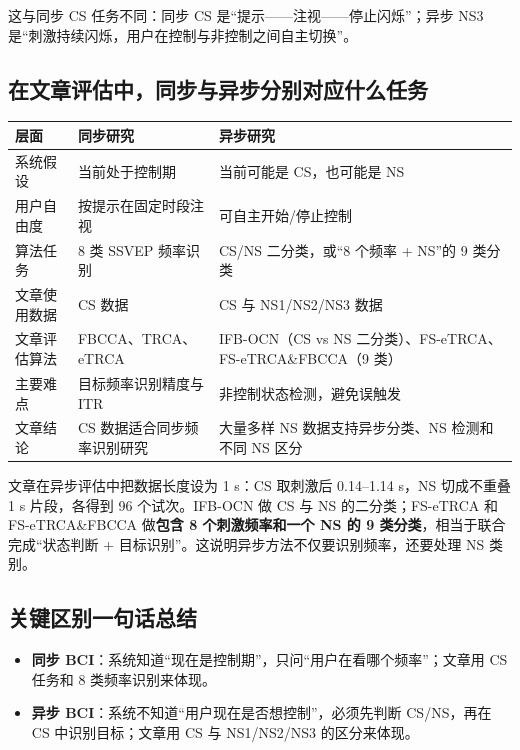 \documentclass[12pt, a4paper]{ctexart}
\begin{document}
这与同步 CS 任务不同：同步 CS 是``提示——注视——停止闪烁''；异步 NS3 是``刺激持续闪烁，用户在控制与非控制之间自主切换''。

\subsection{在文章评估中，同步与异步分别对应什么任务}

\begin{table}[h]
\centering\small
\begin{tabularx}{\textwidth}{lYY}
\toprule
\textbf{层面} & \textbf{同步研究} & \textbf{异步研究} \\
\midrule
系统假设 & 当前处于控制期 & 当前可能是 CS，也可能是 NS \\
用户自由度 & 按提示在固定时段注视 & 可自主开始/停止控制 \\
算法任务 & 8 类 SSVEP 频率识别 & CS/NS 二分类，或``8 个频率 + NS''的 9 类分类 \\
文章使用数据 & CS 数据 & CS 与 NS1/NS2/NS3 数据 \\
文章评估算法 & FBCCA、TRCA、eTRCA & IFB-OCN（CS vs NS 二分类）、FS-eTRCA、FS-eTRCA\&FBCCA（9 类） \\
主要难点 & 目标频率识别精度与 ITR & 非控制状态检测，避免误触发 \\
文章结论 & CS 数据适合同步频率识别研究 & 大量多样 NS 数据支持异步分类、NS 检测和不同 NS 区分 \\
\bottomrule
\end{tabularx}
\end{table}

文章在异步评估中把数据长度设为 1 s：CS 取刺激后 0.14--1.14 s，NS 切成不重叠 1 s 片段，各得到 96 个试次。IFB-OCN 做 CS 与 NS 的二分类；FS-eTRCA 和 FS-eTRCA\&FBCCA 做\textbf{包含 8 个刺激频率和一个 NS 的 9 类分类}，相当于联合完成``状态判断 + 目标识别''。这说明异步方法不仅要识别频率，还要处理 NS 类别。

\subsection{关键区别一句话总结}

\begin{itemize}
  \item \textbf{同步 BCI}：系统知道``现在是控制期''，只问``用户在看哪个频率''；文章用 CS 任务和 8 类频率识别来体现。
  \item \textbf{异步 BCI}：系统不知道``用户现在是否想控制''，必须先判断 CS/NS，再在 CS 中识别目标；文章用 CS 与 NS1/NS2/NS3 的区分来体现。
\end{itemize}
\end{document}
